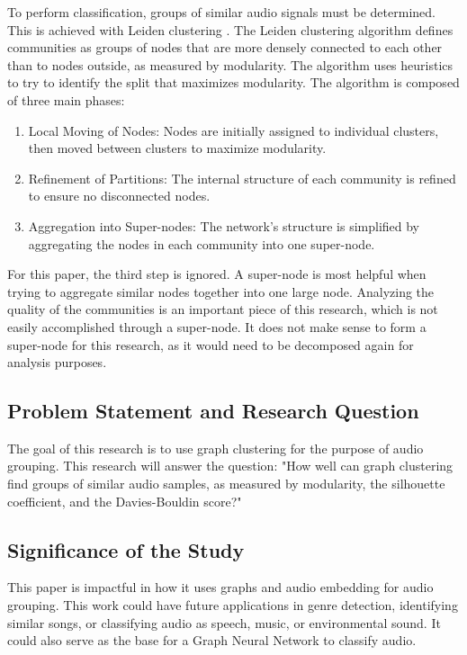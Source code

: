 \documentclass{article}
\begin{document}
To perform classification, groups of similar audio signals must be determined. This is achieved with Leiden clustering \cite{traag}. The Leiden clustering algorithm defines communities as groups of nodes that are more densely connected to each other than to nodes outside, as measured by modularity. The algorithm uses heuristics to try to identify the split that maximizes modularity. The algorithm is composed of three main phases:
\begin{enumerate}[noitemsep]
  \item Local Moving of Nodes: Nodes are initially assigned to individual clusters, then moved between clusters to maximize modularity.
  \item Refinement of Partitions: The internal structure of each community is refined to ensure no disconnected nodes.
  \item Aggregation into Super-nodes: The network's structure is simplified by aggregating the nodes in each community into one super-node.
\end{enumerate}
For this paper, the third step is ignored. A super-node is most helpful when trying to aggregate similar nodes together into one large node. Analyzing the quality of the communities is an important piece of this research, which is not easily accomplished through a super-node. It does not make sense to form a super-node for this research, as it would need to be decomposed again for analysis purposes. 

\subsection{Problem Statement and Research Question}
The goal of this research is to use graph clustering for the purpose of audio grouping. This research will answer the question: "How well can graph clustering find groups of similar audio samples, as measured by modularity, the silhouette coefficient, and the Davies-Bouldin score?" 

\subsection{Significance of the Study}
This paper is impactful in how it uses graphs and audio embedding for audio grouping. This work could have future applications in genre detection, identifying similar songs, or classifying audio as speech, music, or environmental sound. It could also serve as the base for a Graph Neural Network to classify audio.
\end{document}
